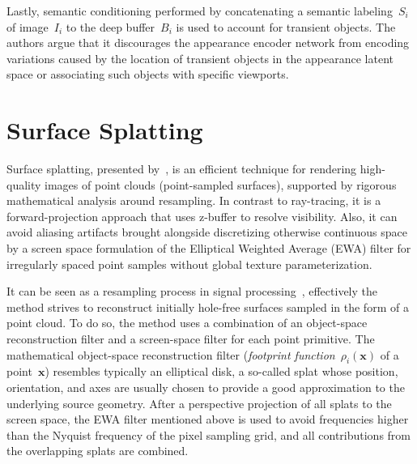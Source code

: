 Lastly, semantic conditioning performed by concatenating a semantic labeling~$S_i$ of
image~$I_i$ to the deep buffer~$B_i$ is used to account for transient objects. The authors argue that
it discourages the appearance encoder network from encoding variations caused by the location of
transient objects in the appearance latent space or associating such objects with specific viewports.

\section{Surface Splatting}

Surface splatting, presented by~\citet{SurfaceSplatting}, is an efficient technique for rendering high-quality
images of point clouds (point-sampled surfaces), supported by rigorous mathematical analysis around
resampling. In contrast to ray-tracing, it is a forward-projection approach that uses z-buffer to
resolve visibility. Also, it can avoid aliasing artifacts brought alongside discretizing otherwise
continuous space by a screen space formulation of the Elliptical Weighted Average (EWA) filter for
irregularly spaced point samples without global texture parameterization.

It can be seen as a resampling process in signal processing~\citep{PointRendering}, effectively the method
strives to reconstruct initially hole-free surfaces sampled in the form of a point cloud. To do so, the method
uses a combination of an object-space reconstruction filter and a screen-space filter for each point primitive.
The mathematical object-space reconstruction filter (\emph{footprint function}~$\rho_i(\mathbf{x})$ of a point~$\mathbf{x}$)
resembles typically an elliptical disk, a so-called splat whose position, orientation, and axes are usually
chosen to provide a good approximation to the underlying source geometry. After a perspective projection of all splats
to the screen space, the EWA filter mentioned above is used to avoid frequencies higher than the Nyquist frequency
of the pixel sampling grid, and all contributions from the overlapping splats are combined.

